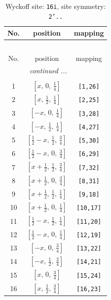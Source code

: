 \documentclass[fleqn,8pt]{jsarticle}
\begin{document}
\begin{longtable}{ccc}
\caption{Wyckoff site: {\tt 16i}, site symmetry: {\tt 2'..}}
 \\
 \hline \hline
No. & position & mapping \\ \hline \endfirsthead

\multicolumn{2}{l}{\tablename\ \thetable{}} \\
 \hline \hline
No. & position & mapping \\ \hline \endhead

 \hline \hline
\multicolumn{2}{r}{\footnotesize\it continued ...} \\ \endfoot

 \hline \hline
\multicolumn{2}{r}{} \\ \endlastfoot

1 & $\left[ x,\, 0,\, \frac{1}{4} \right]$ & {\tt [1,26]} \\ \hline
2 & $\left[ x,\, \frac{1}{2},\, \frac{1}{4} \right]$ & {\tt [2,25]} \\ \hline
3 & $\left[ - x,\, 0,\, \frac{1}{4} \right]$ & {\tt [3,28]} \\ \hline
4 & $\left[ - x,\, \frac{1}{2},\, \frac{1}{4} \right]$ & {\tt [4,27]} \\ \hline
5 & $\left[ \frac{1}{2} - x,\, \frac{1}{2},\, \frac{3}{4} \right]$ & {\tt [5,30]} \\ \hline
6 & $\left[ \frac{1}{2} - x,\, 0,\, \frac{3}{4} \right]$ & {\tt [6,29]} \\ \hline
7 & $\left[ x + \frac{1}{2},\, \frac{1}{2},\, \frac{3}{4} \right]$ & {\tt [7,32]} \\ \hline
8 & $\left[ x + \frac{1}{2},\, 0,\, \frac{3}{4} \right]$ & {\tt [8,31]} \\ \hline
9 & $\left[ x + \frac{1}{2},\, \frac{1}{2},\, \frac{1}{4} \right]$ & {\tt [9,18]} \\ \hline
10 & $\left[ x + \frac{1}{2},\, 0,\, \frac{1}{4} \right]$ & {\tt [10,17]} \\ \hline
11 & $\left[ \frac{1}{2} - x,\, \frac{1}{2},\, \frac{1}{4} \right]$ & {\tt [11,20]} \\ \hline
12 & $\left[ \frac{1}{2} - x,\, 0,\, \frac{1}{4} \right]$ & {\tt [12,19]} \\ \hline
13 & $\left[ - x,\, 0,\, \frac{3}{4} \right]$ & {\tt [13,22]} \\ \hline
14 & $\left[ - x,\, \frac{1}{2},\, \frac{3}{4} \right]$ & {\tt [14,21]} \\ \hline
15 & $\left[ x,\, 0,\, \frac{3}{4} \right]$ & {\tt [15,24]} \\ \hline
16 & $\left[ x,\, \frac{1}{2},\, \frac{3}{4} \right]$ & {\tt [16,23]} \\
\end{longtable}
\end{document}
